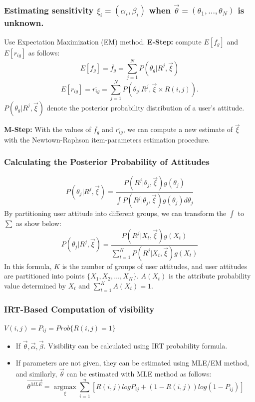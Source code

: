 \documentclass{beamer}
\begin{document}
\begin{frame}
  \frametitle{\small{Estimating sensitivity $\xi_i=(\alpha_i,\beta_i)$ when
      $\overrightarrow{\theta}=(\theta_1,\dots,\theta_N)$ is unknown.}}
  \begin{block}
      {Use Expectation Maximization (EM) method.}
      \textbf{E-Step:} compute $E[f_g]$ and $E[r_{ig}]$ as follows:
      \[E[f_g]=\overline{f_g}=\sum_{j=1}^NP(\theta_g|R^j,\overrightarrow{\xi})\] 
      \[E[r_{ig}]=\overline{r_{ig}}=\sum_{j=1}^NP(\theta_g|R^j,\overrightarrow{\xi}\times R(i,j)).\]
      $P(\theta_g|R^j,\overrightarrow{\xi})$ denote the posterior probability
      distribution of a user's attitude. 

      \textbf{M-Step:}
      With the values of $\overline{f_g}$ and $\overline{r_{ig}}$, we can
      compute a new estimate of $\overrightarrow{\xi}$ with the Newtown-Raphson
      item-parameters estimation procedure. 
  \end{block}
\end{frame}

\begin{frame}
  \frametitle{Calculating the Posterior Probability of Attitudes}
  \[P(\theta_j|R^j,\overrightarrow{\xi})=\frac{P(R^j|\theta_j,\overrightarrow{\xi})g(\theta_j)}
  {\int{P(R^j|\theta_j,\overrightarrow{\xi})g(\theta_j)d\theta_j}}\]
  By partitioning user attitude into different groups, we can transform the $\int$
  to $\sum$ as show below: 
  \[P(\theta_j|R^j,\overrightarrow{\xi})=\frac{P(R^j|X_t,\overrightarrow{\xi})g(X_t)}
  {\sum_{t=1}^K{P(R^j|X_t,\overrightarrow{\xi})g(X_t)}}\]
  In this formula, $K$ is the number of groups of user attitudes, and user
  attitudes are partitioned into points $\{X_1,X_2,\ldots,X_K\}$. $A(X_t)$ is
  the attribute probability value determined by $X_t$ and $\sum_{t=1}^KA(X_t)=1$.
\end{frame}

% 
\begin{frame}
  \frametitle{IRT-Based Computation of visibility}
  {$V(i,j)=P_{ij}=Prob\{R(i,j)=1\}$}
  \begin{itemize}
  \item If $\overrightarrow{\theta}, \overrightarrow{\alpha},
    \overrightarrow{\beta}$. Visibility can be calculated using IRT
    probability formula. 
  \item If parameters are not given, they can be estimated using MLE/EM method,
    and similarly, $\overrightarrow{\theta}$ can be estimated with MLE method
    as follows: 
    \[\overrightarrow{\theta^{MLE}}=\underset{\xi}{\operatorname{\arg\max}}
      {\sum_{i=1}^n[R(i,j)logP_{ij}+(1-R(i,j))log(1-P_{ij})]}\]
    \end{itemize}
\end{frame}
\end{document}
